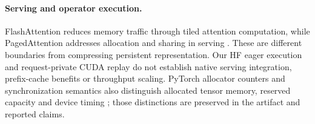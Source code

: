 \paragraph{Serving and operator execution.}
FlashAttention reduces memory traffic through tiled attention computation,
while PagedAttention addresses allocation and sharing in serving
\citep{dao2022flashattention,kwon2023paged}. These are different boundaries
from compressing persistent representation. Our HF eager execution and
request-private CUDA replay do not establish native serving integration,
prefix-cache benefits or throughput scaling. PyTorch allocator counters
and synchronization semantics also distinguish allocated tensor memory,
reserved capacity and device timing \citep{pytorch2025cuda}; those
distinctions are preserved in the artifact and reported claims.
